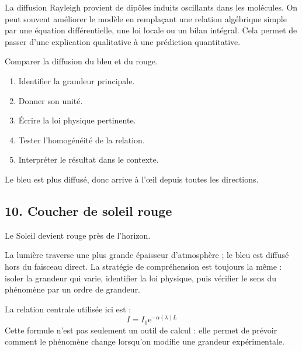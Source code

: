 \documentclass[11pt,a4paper]{article}
\newcommand{\e}{\mathrm e}
\begin{document}
\begin{approfondissementbox}
La diffusion Rayleigh provient de dipôles induits oscillants dans les molécules.
On peut souvent améliorer le modèle en remplaçant une relation algébrique simple par une équation différentielle, une loi locale ou un bilan intégral. Cela permet de passer d'une explication qualitative à une prédiction quantitative.
\end{approfondissementbox}

\begin{exercicebox}
Comparer la diffusion du bleu et du rouge.
\begin{enumerate}
  \item Identifier la grandeur principale.
  \item Donner son unité.
  \item Écrire la loi physique pertinente.
  \item Tester l'homogénéité de la relation.
  \item Interpréter le résultat dans le contexte.
\end{enumerate}
\end{exercicebox}

\begin{corrigebox}[Indication]
Le bleu est plus diffusé, donc arrive à l'œil depuis toutes les directions.
\end{corrigebox}


\subsection{10. Coucher de soleil rouge}

\begin{exemplebox}
Le Soleil devient rouge près de l'horizon.
\end{exemplebox}

\begin{methodebox}
La lumière traverse une plus grande épaisseur d'atmosphère ; le bleu est diffusé hors du faisceau direct.
La stratégie de compréhension est toujours la même : isoler la grandeur qui varie, identifier la loi physique, puis vérifier le sens du phénomène par un ordre de grandeur.
\end{methodebox}

\begin{theorembox}
La relation centrale utilisée ici est :
\[
I=I_0\e^{-\alpha(\lambda)L}
\]
Cette formule n'est pas seulement un outil de calcul : elle permet de prévoir comment le phénomène change lorsqu'on modifie une grandeur expérimentale.
\end{theorembox}
\end{document}
